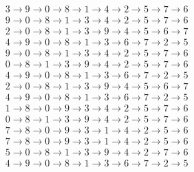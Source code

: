 \documentclass[12pt]{scrartcl}
\begin{document}
\begin{align*}
    & 3\rightarrow 9\rightarrow 0\rightarrow 8\rightarrow 1\rightarrow 4\rightarrow 2\rightarrow 5\rightarrow 7\rightarrow 6 \\
    & 9\rightarrow 0\rightarrow 8\rightarrow 1\rightarrow 3\rightarrow 4\rightarrow 2\rightarrow 5\rightarrow 7\rightarrow 6 \\
    & 2\rightarrow 0\rightarrow 8\rightarrow 1\rightarrow 3\rightarrow 9\rightarrow 4\rightarrow 5\rightarrow 6\rightarrow 7 \\
    & 4\rightarrow 9\rightarrow 0\rightarrow 8\rightarrow 1\rightarrow 3\rightarrow 6\rightarrow 7\rightarrow 2\rightarrow 5 \\
    & 9\rightarrow 0\rightarrow 8\rightarrow 1\rightarrow 3\rightarrow 4\rightarrow 2\rightarrow 5\rightarrow 7\rightarrow 6 \\
    & 0\rightarrow 8\rightarrow 1\rightarrow 3\rightarrow 9\rightarrow 4\rightarrow 2\rightarrow 5\rightarrow 7\rightarrow 6 \\
    & 4\rightarrow 9\rightarrow 0\rightarrow 8\rightarrow 1\rightarrow 3\rightarrow 6\rightarrow 7\rightarrow 2\rightarrow 5 \\
    & 2\rightarrow 0\rightarrow 8\rightarrow 1\rightarrow 3\rightarrow 9\rightarrow 4\rightarrow 5\rightarrow 6\rightarrow 7 \\
    & 4\rightarrow 9\rightarrow 0\rightarrow 8\rightarrow 1\rightarrow 3\rightarrow 6\rightarrow 7\rightarrow 2\rightarrow 5 \\
    & 1\rightarrow 8\rightarrow 0\rightarrow 9\rightarrow 3\rightarrow 4\rightarrow 2\rightarrow 5\rightarrow 7\rightarrow 6 \\
    & 0\rightarrow 8\rightarrow 1\rightarrow 3\rightarrow 9\rightarrow 4\rightarrow 2\rightarrow 5\rightarrow 7\rightarrow 6 \\
    & 7\rightarrow 8\rightarrow 0\rightarrow 9\rightarrow 3\rightarrow 1\rightarrow 4\rightarrow 2\rightarrow 5\rightarrow 6 \\
    & 7\rightarrow 8\rightarrow 0\rightarrow 9\rightarrow 3\rightarrow 1\rightarrow 4\rightarrow 2\rightarrow 5\rightarrow 6 \\
    & 5\rightarrow 0\rightarrow 8\rightarrow 1\rightarrow 3\rightarrow 9\rightarrow 4\rightarrow 2\rightarrow 7\rightarrow 6 \\
    & 4\rightarrow 9\rightarrow 0\rightarrow 8\rightarrow 1\rightarrow 3\rightarrow 6\rightarrow 7\rightarrow 2\rightarrow 5 \\
\end{align*}
\end{document}
